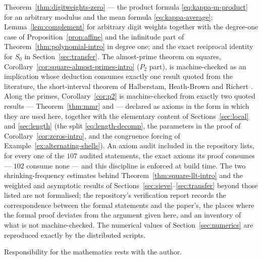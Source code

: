 \documentclass[11pt,reqno]{amsart}
\theoremstyle{plain}
\theoremstyle{definition}
\newcommand{\1}{\mathbf 1}
\begin{document}
Theorem~\ref{thm:digitweights-zero} --- the product formula
\eqref{eq:kappa-m-product} for an arbitrary modulus and the mean formula
\eqref{eq:kappa-average}; Lemma~\ref{lem:complement} for arbitrary digit
weights together with the degree-one case of Proposition~\ref{prop:affine}
and the infinitude part of Theorem~\ref{thm:polynomial-intro} in degree one;
and the exact reciprocal identity for $S_0$ in Section~\ref{sec:transfer}.
The almost-prime theorem on squares,
Corollary~\ref{cor:square-almost-primes-intro} ($P_2$ part), is
machine-checked as an implication whose deduction consumes exactly one
result quoted from the literature, the short-interval theorem of Halberstam,
Heath-Brown and Richert \cite{hhbr}. Along the primes, Corollary~\ref{cor:p2}
is machine-checked from exactly two quoted results ---
Theorem~\ref{thm:mmr} and \cite{hhbr} --- declared as axioms in the form in
which they are used here, together with the elementary content of
Sections~\ref{sec:local} and \ref{sec:length} (the split
\eqref{eq:length-decomp}, the parameters in the proof of
Corollary~\ref{cor:zeros-intro}, and the congruence forcing of
Example~\ref{ex:alternating-shells}). An axiom audit included in the
repository lists, for every one of the $107$ audited statements, the exact
axioms its proof consumes --- $102$ consume none --- and this discipline is
enforced at build time. The two shrinking-frequency estimates behind
Theorem~\ref{thm:square-llt-intro} and the weighted and asymptotic results
of Sections~\ref{sec:sieve}--\ref{sec:transfer} beyond those listed are not
formalised; the repository's verification report records the correspondence
between the formal statements and the paper's, the places where the formal
proof deviates from the argument given here, and an inventory of what is not
machine-checked. The numerical values of Section~\ref{sec:numerics} are
reproduced exactly by the distributed scripts.

Responsibility for the mathematics rests with the author.
\end{document}
